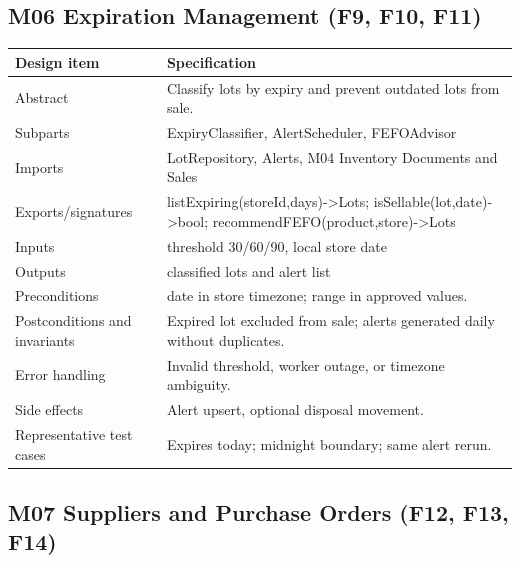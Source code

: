 \subsection{M06 Expiration Management (F9, F10, F11)}\label{m06-expiration-management-f9-f10-f11}

{\def\LTcaptype{none} %
\begin{longtable}[]{|
  >{\raggedright\arraybackslash}m{}|
  >{\raggedright\arraybackslash}m{}|}
\hline
\begin{minipage}[c]{\linewidth}\raggedright
\textbf{Design item}
\end{minipage} & \begin{minipage}[c]{\linewidth}\raggedright
\textbf{Specification}
\end{minipage} \\
\hline
\endhead

\endlastfoot
Abstract & Classify lots by expiry and prevent outdated lots from sale. \\ \hline
Subparts & ExpiryClassifier, AlertScheduler, FEFOAdvisor \\ \hline
Imports & LotRepository, Alerts, M04 Inventory Documents and Sales \\ \hline
Exports/signatures & listExpiring(storeId,days)-\textgreater Lots; isSellable(lot,date)-\textgreater bool; recommendFEFO(product,store)-\textgreater Lots \\ \hline
Inputs & threshold 30/60/90, local store date \\ \hline
Outputs & classified lots and alert list \\ \hline
Preconditions & date in store timezone; range in approved values. \\ \hline
Postconditions and invariants & Expired lot excluded from sale; alerts generated daily without duplicates. \\ \hline
Error handling & Invalid threshold, worker outage, or timezone ambiguity. \\ \hline
Side effects & Alert upsert, optional disposal movement. \\ \hline
Representative test cases & Expires today; midnight boundary; same alert rerun. \\ \hline
\end{longtable}
}

\subsection{M07 Suppliers and Purchase Orders (F12, F13, F14)}\label{m07-suppliers-and-purchase-orders-f12-f13-f14}

